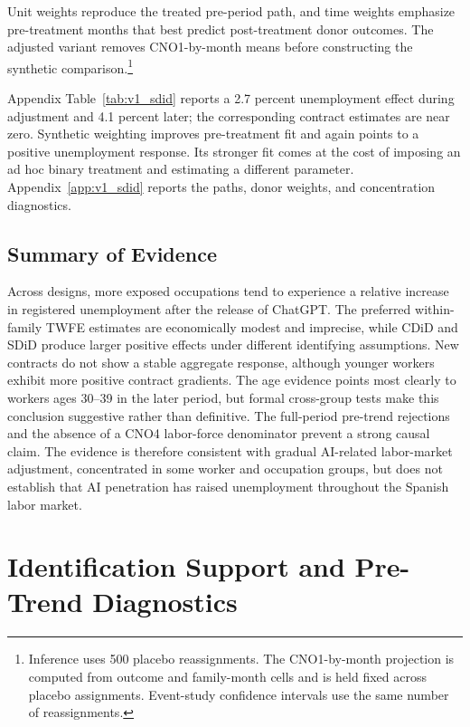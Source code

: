 \documentclass[11pt]{article}
\begin{document}
Unit weights reproduce the treated pre-period path, and time weights emphasize pre-treatment months that best predict post-treatment donor outcomes. The adjusted variant removes CNO1-by-month means before constructing the synthetic comparison.\footnote{Inference uses 500 placebo reassignments. The CNO1-by-month projection is computed from outcome and family-month cells and is held fixed across placebo assignments. Event-study confidence intervals use the same number of reassignments.}

Appendix Table~\ref{tab:v1_sdid} reports a 2.7 percent unemployment effect during adjustment and 4.1 percent later; the corresponding contract estimates are near zero. Synthetic weighting improves pre-treatment fit and again points to a positive unemployment response. Its stronger fit comes at the cost of imposing an ad hoc binary treatment and estimating a different parameter. Appendix~\ref{app:v1_sdid} reports the paths, donor weights, and concentration diagnostics.

\subsection{Summary of Evidence}
\label{sec:v1_synthesis}

Across designs, more exposed occupations tend to experience a relative increase in registered unemployment after the release of ChatGPT. The preferred within-family TWFE estimates are economically modest and imprecise, while CDiD and SDiD produce larger positive effects under different identifying assumptions. New contracts do not show a stable aggregate response, although younger workers exhibit more positive contract gradients. The age evidence points most clearly to workers ages 30--39 in the later period, but formal cross-group tests make this conclusion suggestive rather than definitive. The full-period pre-trend rejections and the absence of a CNO4 labor-force denominator prevent a strong causal claim. The evidence is therefore consistent with gradual AI-related labor-market adjustment, concentrated in some worker and occupation groups, but does not establish that AI penetration has raised unemployment throughout the Spanish labor market.

\clearpage
\appendix
{}

\section{Identification Support and Pre-Trend Diagnostics}
\label{app:v1_support}
\end{document}
